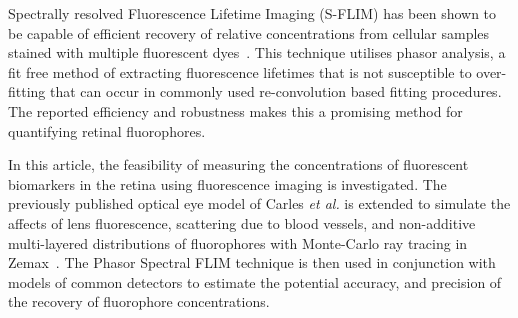 \documentclass{optica-article}
\begin{document}
Spectrally resolved Fluorescence Lifetime Imaging (S-FLIM) has been shown to be capable of efficient recovery of relative concentrations from cellular samples stained with multiple fluorescent dyes~\cite{scipioni2021phasor}. This technique utilises phasor analysis, a fit free method of extracting fluorescence lifetimes that is not susceptible to over-fitting that can occur in commonly used re-convolution based fitting procedures. The reported efficiency and robustness makes this a promising method for quantifying retinal fluorophores. 

In this article, the feasibility of measuring the concentrations of fluorescent biomarkers in the retina using fluorescence imaging is investigated. The previously published optical eye model of Carles \textit{et al.} is extended to simulate the affects of lens fluorescence, scattering due to blood vessels, and non-additive multi-layered distributions of fluorophores with Monte-Carlo ray tracing in Zemax~\cite{carles2019holistic}. The Phasor Spectral FLIM technique is then used in conjunction with models of common detectors to estimate the potential accuracy, and precision of the recovery of fluorophore concentrations.


\end{document}
